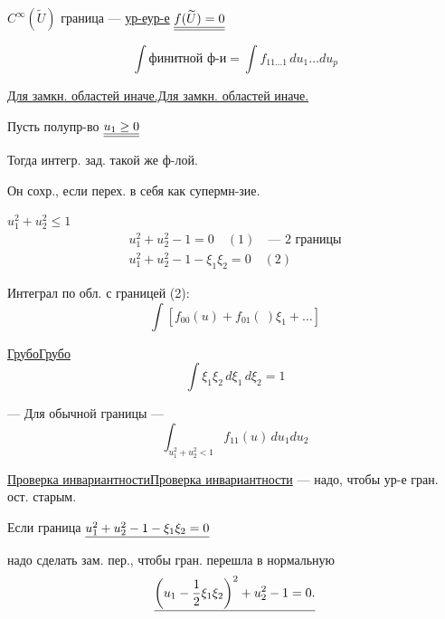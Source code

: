 \documentclass[11pt]{article}
\theoremstyle{definition}
\theoremstyle{remark}
\newcommand{\Unclear}[3]{%
  \begingroup\color{orange!70!black}%
  [Unresolved reading #1/#2: #3]\endgroup%
}
\renewcommand{\Unclear}[3]{%
  \begingroup\color{orange!65!black}%
  \ifmmode\text{[неясно: #3]}\else[неясно: #3]\fi\endgroup%
}
\let\DiplomaticMathUnderline\underline
\renewcommand{\underline}[1]{\ifmmode\DiplomaticMathUnderline{#1}\else\uline{#1}\fi}
\begin{document}
$C^\infty(\widetilde U)$ \qquad граница — \underline{ур-е} $\underline{\underline{f(\widetilde U)=0}}$

\begin{equation*}
\int\text{финитной ф-и}=\int f_{11\ldots1}\,du_1\ldots du_p
\end{equation*}

\underline{Для замкн. областей иначе.}

Пусть полупр-во $\underline{\underline{u_1\ge0}}$

Тогда интегр. зад. такой же ф-лой.

Он сохр., если перех. в себя как супермн-зие.

\begin{adjustbox}{max width=\linewidth}
\end{adjustbox}
$u_1^2+u_2^2\le1$
\begin{gather*}
u_1^2+u_2^2-1=0\quad(1)\quad\text{— 2 границы}\\
u_1^2+u_2^2-1-\xi_1\xi_2=0\quad(2)
\end{gather*}

Интеграл по обл. с границей (2):
\begin{equation*}
\int[f_{00}(u)+f_{01}(\ )\xi_1+\ldots]
\end{equation*}

\underline{Грубо}
\begin{equation*}
\int\xi_1\xi_2\,d\xi_1\,d\xi_2=1
\end{equation*}

— Для обычной границы —
\begin{equation*}
\int_{u_1^2+u_2^2<1}f_{11}(u)\,du_1du_2
\end{equation*}

\underline{Проверка инвариантности} — надо, чтобы ур-е гран. ост. старым.

Если граница $\underline{u_1^2+u_2^2-1-\xi_1\xi_2=0}$

надо сделать зам. пер., чтобы гран. перешла в нормальную
\begin{equation*}
\underline{\left(u_1-\frac12\xi_1\xi_2\right)^2+u_2^2-1=0.}
\end{equation*}

\Unclear{GELFAND-P000672}{upper-cancellation}{зачёркнуто: u=0 — чтение неуверенное}
\end{document}
